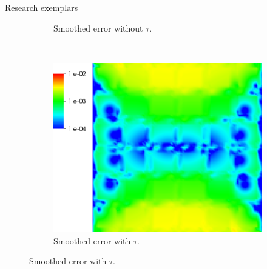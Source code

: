 \documentclass{beamer}
\begin{document}
\begin{frame}{Research exemplars}
\begin{figure}
\begin{subfigure}[b]{0.28\textwidth}
    \caption{Smoothed error without $\tau$.}\label{fig:elast-error-notau}
  \end{subfigure} ~
  \begin{subfigure}[b]{0.28\textwidth}
    \includegraphics[width=\textwidth]{figures/MG/ElasticityCompressErrorTauTrim}
    \caption{Smoothed error with $\tau$.}\label{fig:elast-error-tau}
  \end{subfigure}
\end{figure}
\end{frame}
\end{document}
